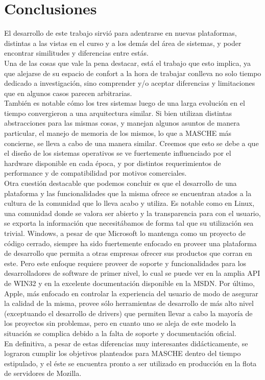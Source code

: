 \section{Conclusiones}

El desarrollo de este trabajo sirvió para adentrarse en nuevas plataformas,
distintas a las vistas en el curso y a los demás del área de sistemas, y poder
encontrar similitudes y diferencias entre estás.\\

Una de las cosas que vale la pena destacar, está el trabajo que esto implica,
ya que alejarse de su espacio de confort a la hora de trabajar conlleva no solo
tiempo dedicado a investigación, sino comprender y/o aceptar diferencias y
limitaciones que en algunos casos parecen arbitrarias.\\

También es notable cómo los tres sistemas luego de una larga evolución en el
tiempo convergieron a una arquitectura similar. Si bien utilizan distintas
abstracciones para las mismas cosas, y manejan algunos asuntos de manera
particular, el manejo de memoria de los mismos, lo que a MASCHE más concierne,
se lleva a cabo de una manera similar. Creemos que esto se debe a que el diseño
de los sistemas operativos se ve fuertemente influenciado por el hardware
disponible en cada época, y por distintos requerimientos de performance y de
compatibilidad por motivos comerciales.\\

Otra cuestión destacable que podemos concluir es que el desarrollo de una
plataforma y las funcionalidades que la misma ofrece se encuentran atados a la
cultura de la comunidad que lo lleva acabo y utiliza. Es notable como en Linux,
una comunidad donde se valora ser abierto y la transparencia para con el
usuario, se exporta la información que necesitábamos de forma tal que su
utilización sea trivial. Windows, a pesar de que Microsoft lo mantenga como un
proyecto de código cerrado, siempre ha sido fuertemente enfocado en proveer una
plataforma de desarrollo que permita a otras empresas ofrecer sus productos que
corran en este. Pero este enfoque requiere proveer de soporte y funcionalidades
para los desarrolladores de software de primer nivel, lo cual se puede ver en
la amplia API de WIN32 y en la excelente documentación disponible en la MSDN.
Por último, Apple, más enfocado en controlar la experiencia del usuario de modo
de asegurar la calidad de la misma, provee sólo herramientas de desarrollo de
más alto nivel (exceptuando el desarrollo de drivers) que permiten llevar a
cabo la mayoría de los proyectos sin problemas, pero en cuanto uno se aleja de
este modelo la situación se complica debido a la falta de soporte y
documentación oficial.\\

En definitiva, a pesar de estas diferencias muy interesantes didácticamente, se
lograron cumplir los objetivos planteados para MASCHE dentro del tiempo
estipulado, y el éste se encuentra pronto a ser utilizado en producción en la
flota de servidores de Mozilla.\\

